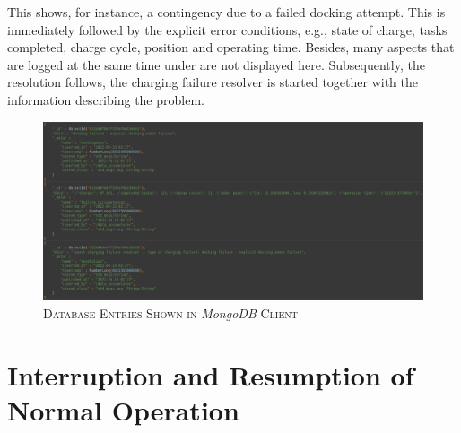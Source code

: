 \documentclass[english, master, utf8]{base/thesis_KBS}
\newcommand{\code}{\collectverb{\codebox}}
\begin{document}
This shows, for instance, a contingency due to a failed docking attempt. This is immediately followed by the explicit error conditions, e.g., state of charge, tasks completed, charge
cycle, position and operating time. Besides, many aspects that are logged at the same time under \code{robot_info} are not displayed here. Subsequently, the resolution follows, the
charging failure resolver is started together with the information describing the problem.
\begin{figure}[H]
    \centering
    \includegraphics[width=\textwidth]{pics/database_entries.png}
    \caption{\textsc{Database Entries Shown in} \textit{MongoDB} \textsc{Client}}
    \label{fig:database_entries}
\end{figure}

\section{Interruption and Resumption of Normal Operation}
\label{sec:plan_interruption_section}
\end{document}
